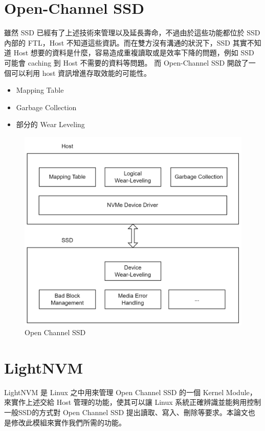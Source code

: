 \section{Open-Channel SSD}\label{s2.3}
\indent
雖然 SSD 已經有了上述技術來管理以及延長壽命，不過由於這些功能都位於 SSD 內部的 FTL，Host 不知道這些資訊。而在雙方沒有溝通的狀況下，SSD 其實不知道 Host 想要的資料是什麼，容易造成重複讀取或是效率下降的問題，例如 SSD 可能會 caching 到 Host 不需要的資料等問題。
而 Open-Channel SSD 開啟了一個可以利用 host 資訊增進存取效能的可能性。
\begin{itemize}
    \item Mapping Table
    \item Garbage Collection
    \item 部分的 Wear Leveling
\end{itemize}
\begin{figure}[H]
    \centering
    \includegraphics[width=1\textwidth]{picture/ch2/OPSSD.png}
    \caption{Open Channel SSD\cite{OPSSD}}
    \label{f2.8}
\end{figure}

\section{LightNVM}\label{s2.4}
\indent
LightNVM 是 Linux 之中用來管理 Open Channel SSD 的一個 Kernel Module，來實作上述交給 Host 管理的功能，使其可以讓 Linux 系統正確辨識並能夠用控制一般SSD的方式對 Open Channel SSD 提出讀取、寫入、刪除等要求。本論文也是修改此模組來實作我們所需的功能。

